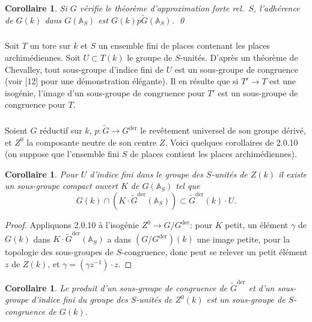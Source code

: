 \documentclass[12pt,a4paper]{article}
\theoremstyle{plain}
\newtheorem{corollary}[theorem]{Corollaire}
\theoremstyle{definition}
\theoremstyle{remark}
\newcommand{\A}{\mathbb{A}}
\begin{document}
\begin{corollary}
Si $G$ v\'erifie le th\'eor\`eme d'approximation forte rel.~$S$, l'adh\'erence de $G(k)$ dans $G(\A_S)$ est $G(k)p\tilde{G}(\A_S)$.
\qed
\end{corollary}

\subsubsection{}

Soit $T$ un tore sur $k$ et $S$ un ensemble fini de places contenant les places archim\'ediennes. Soit $U \subset T(k)$ le groupe de $S$-unit\'es. D'apr\`es un th\'eor\`eme de Chevalley, tout sous-groupe d'indice fini de $U$ est un sous-groupe de congruence (voir [12] pour une d\'emonstration \'el\'egante). Il en r\'esulte que si $T' \to T$ est une isog\'enie, l'image d'un sous-groupe de congruence pour $T'$ est un sous-groupe de congruence pour $T$.

\subsubsection{}

Soient $G$ r\'eductif sur $k$, $p:\tilde{G} \to G^{\text{der}}$ le rev\^etement universel de son groupe d\'eriv\'e, et $Z^0$ la composante neutre de son centre $Z$. Voici quelques corollaires de 2.0.10 (on suppose que l'ensemble fini $S$ de places contient les places archim\'ediennes).

\begin{corollary}
Pour $U$ d'indice fini dans le groupe des $S$-unit\'es de $Z(k)$ il existe un sous-groupe compact ouvert $K$ de $G(\A_S)$ tel que
\[
G(k) \cap (K \cdot \tilde{G}^{\text{der}}(\A_S)) \subset \tilde{G}^{\text{der}}(k) \cdot U.
\]
\end{corollary}

\begin{proof}
Appliquons 2.0.10 \`a l'isog\'enie $Z^0 \to G/G^{\text{der}}$: pour $K$ petit, un \'el\'ement $\gamma$ de $G(k)$ dans $K \cdot \tilde{G}^{\text{der}}(\A_S)$ a dans $(G/G^{\text{der}})(k)$ une image petite, pour la topologie des sous-groupes de $S$-congruence, donc peut se relever un petit \'el\'ement $z$ de $Z(k)$, et $\gamma = (\gamma z^{-1}) \cdot z$.
\end{proof}

\begin{corollary}
Le produit d'un sous-groupe de congruence de $\tilde{G}^{\text{der}}$ et d'un sous-groupe d'indice fini du groupe des $S$-unit\'es de $Z^0(k)$ est un sous-groupe de $S$-congruence de $G(k)$.
\end{corollary}
\end{document}

